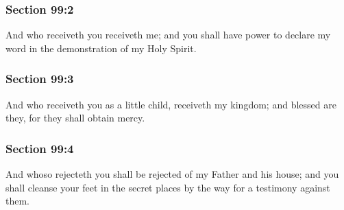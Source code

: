	\subsubsection{Section 99:2} %
		\label{DC99-2}

		And who receiveth you receiveth me; and you shall have power to declare my word in the demonstration of my Holy Spirit.


	\subsubsection{Section 99:3} %
		\label{DC99-3}

		And who receiveth you as a little child, receiveth my kingdom; and blessed are they, for they shall obtain mercy.


	\subsubsection{Section 99:4} %
		\label{DC99-4}

		And whoso rejecteth you shall be rejected of my Father and his house; and you shall cleanse your feet in the secret places by the way for a testimony against them.


